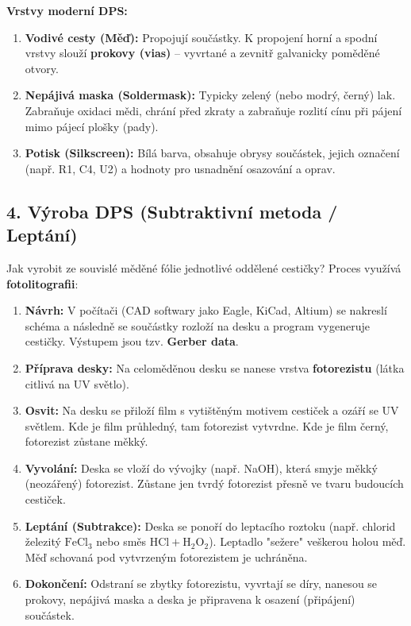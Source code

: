 \documentclass[a4paper,10pt]{article}
\begin{document}
\begin{vysvetlenibox}
\textbf{Vrstvy moderní DPS:}
\begin{enumerate}
    \item \textbf{Vodivé cesty (Měď):} Propojují součástky. K propojení horní a spodní vrstvy slouží \textbf{prokovy (vias)} – vyvrtané a zevnitř galvanicky poměděné otvory.
    \item \textbf{Nepájivá maska (Soldermask):} Typicky zelený (nebo modrý, černý) lak. Zabraňuje oxidaci mědi, chrání před zkraty a zabraňuje rozlití cínu při pájení mimo pájecí plošky (pady).
    \item \textbf{Potisk (Silkscreen):} Bílá barva, obsahuje obrysy součástek, jejich označení (např. R1, C4, U2) a hodnoty pro usnadnění osazování a oprav.
\end{enumerate}

\subsection*{4. Výroba DPS (Subtraktivní metoda / Leptání)}

Jak vyrobit ze souvislé měděné fólie jednotlivé oddělené cestičky? Proces využívá \textbf{fotolitografii}:

\begin{enumerate}
    \item \textbf{Návrh:} V počítači (CAD softwary jako Eagle, KiCad, Altium) se nakreslí schéma a následně se součástky rozloží na desku a program vygeneruje cestičky. Výstupem jsou tzv. \textbf{Gerber data}.
    \item \textbf{Příprava desky:} Na celoměděnou desku se nanese vrstva \textbf{fotorezistu} (látka citlivá na UV světlo).
    \item \textbf{Osvit:} Na desku se přiloží film s vytištěným motivem cestiček a ozáří se UV světlem. Kde je film průhledný, tam fotorezist vytvrdne. Kde je film černý, fotorezist zůstane měkký.
    \item \textbf{Vyvolání:} Deska se vloží do vývojky (např. NaOH), která smyje měkký (neozářený) fotorezist. Zůstane jen tvrdý fotorezist přesně ve tvaru budoucích cestiček.
    \item \textbf{Leptání (Subtrakce):} Deska se ponoří do leptacího roztoku (např. chlorid železitý $\mathrm{FeCl_3}$ nebo směs $\mathrm{HCl} + \mathrm{H_2O_2}$). Leptadlo "sežere" veškerou holou měď. Měď schovaná pod vytvrzeným fotorezistem je uchráněna.
    \item \textbf{Dokončení:} Odstraní se zbytky fotorezistu, vyvrtají se díry, nanesou se prokovy, nepájivá maska a deska je připravena k osazení (připájení) součástek.
\end{enumerate}


\end{vysvetlenibox}
\end{document}
